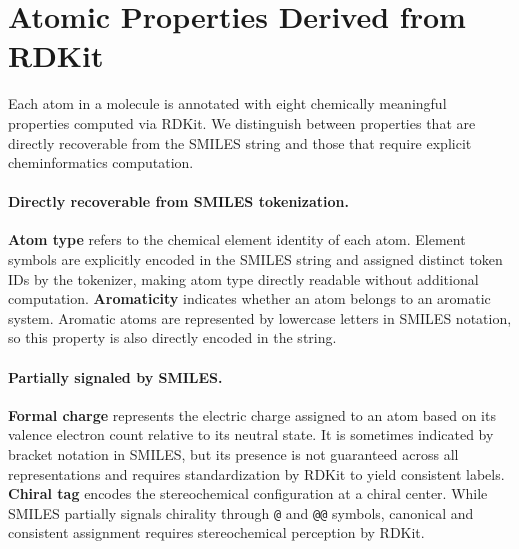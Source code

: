 \section{Atomic Properties Derived from RDKit}
\label{appendix:properties}

Each atom in a molecule is annotated with eight chemically meaningful properties computed via RDKit. We distinguish between properties that are directly recoverable from the SMILES string and those that require explicit cheminformatics computation.

\paragraph{Directly recoverable from SMILES tokenization.}
\textbf{Atom type} refers to the chemical element identity of each atom. Element symbols are explicitly encoded in the SMILES string and assigned distinct token IDs by the tokenizer, making atom type directly readable without additional computation.
\textbf{Aromaticity} indicates whether an atom belongs to an aromatic system. Aromatic atoms are represented by lowercase letters in SMILES notation, so this property is also directly encoded in the string.

\paragraph{Partially signaled by SMILES.}
\textbf{Formal charge} represents the electric charge assigned to an atom based on its valence electron count relative to its neutral state. It is sometimes indicated by bracket notation in SMILES, but its presence is not guaranteed across all representations and requires standardization by RDKit to yield consistent labels.
\textbf{Chiral tag} encodes the stereochemical configuration at a chiral center. While SMILES partially signals chirality through \texttt{@} and \texttt{@@} symbols, canonical and consistent assignment requires stereochemical perception by RDKit.


